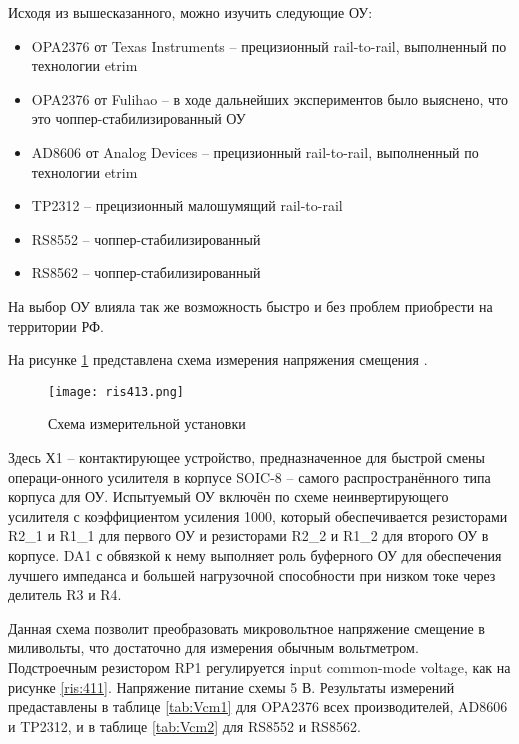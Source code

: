 Исходя из вышесказанного, можно изучить следующие ОУ:

\begin{itemize}
    \item OPA2376 от Texas Instruments -- прецизионный rail-to-rail, выполненный по технологии etrim
    \item OPA2376 от Fulihao -- в ходе дальнейших экспериментов было выяснено, что это 
    чоппер-стабилизированный ОУ
    \item AD8606 от Analog Devices -- прецизионный rail-to-rail, выполненный по технологии etrim
    \item TP2312 -- прецизионный малошумящий rail-to-rail
    \item RS8552 -- чоппер-стабилизированный
    \item RS8562 -- чоппер-стабилизированный
\end{itemize}

На выбор ОУ влияла так же возможность быстро и без проблем приобрести на территории РФ. 

На рисунке \ref{ris:413} представлена схема измерения напряжения смещения \cite{Simple Op Amp Measurements} 
\cite{GOST 23089.3-83}.

\begin{figure}[H]
    \centering
    \texttt{[image: ris413.png]}
    \caption{Схема измерительной установки}
    \label{ris:413}
    \end{figure}

Здесь Х1 -- контактирующее устройство, предназначенное для быстрой смены операци-онного усилителя в 
корпусе SOIC-8 -- самого распространённого типа корпуса для ОУ. Испытуемый ОУ включён по схеме неинвертирующего 
усилителя с коэффициентом усиления 1000, который обеспечивается резисторами R2\_1 и R1\_1 для первого ОУ и
резисторами R2\_2 и R1\_2 для второго ОУ в корпусе. DA1 с обвязкой к нему выполняет роль буферного ОУ для 
обеспечения лучшего импеданса и большей нагрузочной способности при низком токе через делитель R3 и R4.

Данная схема позволит преобразовать микровольтное напряжение смещение в миливольты, что достаточно для 
измерения обычным вольтметром. Подстроечным резистором RP1 регулируется input common-mode voltage, как 
на рисунке \ref{ris:411}. Напряжение питание схемы 5 В. Результаты измерений предаставлены в таблице
\ref{tab:Vcm1} для OPA2376 всех производителей, AD8606 и TP2312, и в таблице \ref{tab:Vcm2} для RS8552 и 
RS8562.

